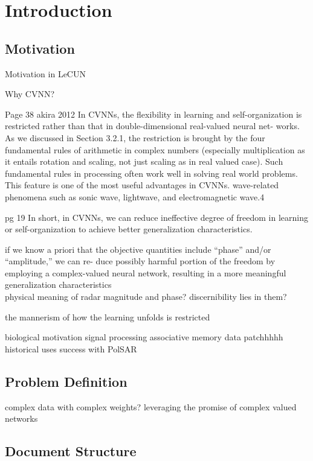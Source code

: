 \chapter{Introduction} \label{chap:intro}

\section{Motivation} \label{sect:thefirst}
Motivation in LeCUN

Why CVNN?

Page 38 akira 2012
 In CVNNs, the flexibility in learning and self-organization
is restricted rather than that in double-dimensional real-valued neural net-
works. As we discussed in Section 3.2.1, the restriction is brought by the four
fundamental rules of arithmetic in complex numbers (especially multiplication as it entails rotation and scaling, not just scaling as in real valued case). Such fundamental rules
in processing often work well in solving real world problems. This feature is
one of the most useful advantages in CVNNs. wave-related phenomena
such as sonic wave, lightwave, and electromagnetic wave.4

pg 19
In short, in CVNNs, we can reduce ineffective degree of freedom in
learning or self-organization to achieve better generalization characteristics.

 if we know a priori
that the objective quantities include “phase” and/or “amplitude,” we can re-
duce possibly harmful portion of the freedom by employing a complex-valued
neural network, resulting in a more meaningful generalization characteristics\\

physical meaning of radar magnitude and phase? discernibility lies in them?

the mannerism of how the learning unfolds is restricted


biological motivation
signal processing
associative memory
data patchhhhh
historical uses
success with PolSAR




\section{Problem Definition} \label{sect:thefirst}
complex data with complex weights?
leveraging the promise of complex valued networks

\section{Document Structure} \label{sect:thefirst}

